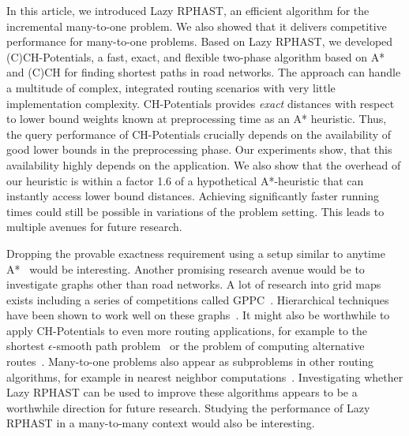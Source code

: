 \documentclass[manuscript,review]{acmart}
\begin{document}
In this article, we introduced Lazy RPHAST, an efficient algorithm for the incremental many-to-one problem.
We also showed that it delivers competitive performance for many-to-one problems.
Based on Lazy RPHAST, we developed (C)CH-Potentials, a fast, exact, and flexible two-phase algorithm based on A* and (C)CH for finding shortest paths in road networks.
The approach can handle a multitude of complex, integrated routing scenarios with very little implementation complexity.
CH-Potentials provides \emph{exact} distances with respect to lower bound weights known at preprocessing time as an A* heuristic.
Thus, the query performance of CH-Potentials crucially depends on the availability of good lower bounds in the preprocessing phase.
Our experiments show, that this availability highly depends on the application.
We also show that the overhead of our heuristic is within a factor 1.6 of a hypothetical A*-heuristic that can instantly access lower bound distances.
Achieving significantly faster running times could still be possible in variations of the problem setting.
This leads to multiple avenues for future research.

Dropping the provable exactness requirement using a setup similar to anytime A*~\cite{DBLP:conf/aaai/ZhouH02,DBLP:conf/nips/LikhachevGT03} would be interesting.
Another promising research avenue would be to investigate graphs other than road networks.
A lot of research into grid maps exists including a series of competitions called GPPC~\cite{DBLP:conf/socs/SturtevantTTUKS15}.
Hierarchical techniques have been shown to work well on these graphs~\cite{DBLP:conf/aaai/UrasK14}.
It might also be worthwhile to apply CH-Potentials to even more routing applications, for example to the shortest $\epsilon$-smooth path problem~\cite{dss-tarrn-18} or the problem of computing alternative routes~\cite{adgw-arrn-13,bdgs-argrn-11,kobitzsch2015alternative}.
Many-to-one problems also appear as subproblems in other routing algorithms, for example in nearest neighbor computations~\cite{buchhold_et_al:LIPIcs.SEA.2021.18}.
Investigating whether Lazy RPHAST can be used to improve these algorithms appears to be a worthwhile direction for future research.
Studying the performance of Lazy RPHAST in a many-to-many context would also be interesting.






\end{document}
